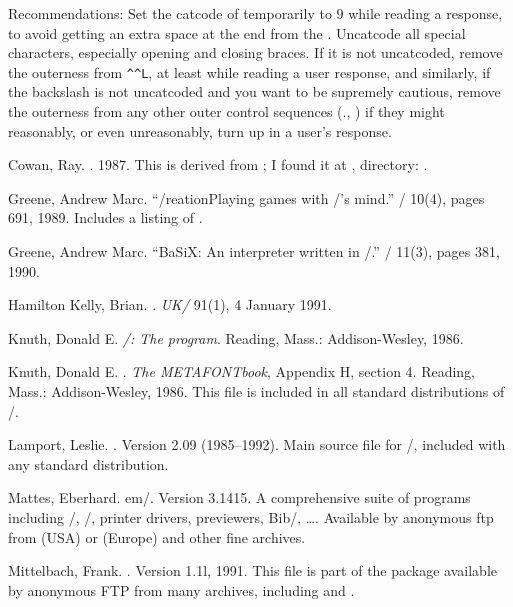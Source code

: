 {Recommendations: Set the catcode of  temporarily to
$9$ while reading a response, to avoid getting an extra space at the
end from the . Uncatcode all special characters, especially
opening and closing braces. If it is not uncatcoded, remove the
outerness from \verb;^^L;, at least while reading a user response, and
similarly, if the backslash is not uncatcoded and you want to be
supremely cautious, remove the outerness from any other outer control
sequences (\eg., ) if they might reasonably, or even
unreasonably, turn up in a user's response.

\begin{thebibliography}{x}

 Cowan, Ray. . 1987. This is
derived from ; I found it at
, directory: .

 Greene, Andrew Marc.
``\tex/reation\Dash Playing games with \tex/'s mind.''
\tugboat/ 10(4), pages 691, 1989. Includes a listing
of .

 Greene, Andrew Marc.
``BaSiX: An interpreter written in \tex/.'' \tugboat/ 11(3),
pages 381, 1990.

{Hamilton Kelly}, Brian. . {\it UK\tex/}
91(1), 4 January 1991.

 Knuth, Donald E. {\sl \tex/: The program}.
Reading, Mass.: Addison-Wesley, 1986.

 Knuth, Donald E. .
{\sl The META\-FONT\-book}, Appendix H, section 4. Reading, Mass.:
Addison-Wesley,  1986. This file is included in all standard
distributions of \mf/.

 Lamport, Leslie. .
Version 2.09 (1985--1992). Main source file for \latex/, included with
any standard distribution.

 Mattes, Eberhard.
em\tex/. Version 3.1415.
A comprehensive suite of programs including \tex/,
\mf/, printer drivers, previewers, Bib\tex/, \dots.
Available by anonymous ftp from  (USA) or
 (Europe) and other fine archives.

 Mittelbach, Frank.
. Version 1.1l, 1991. This file is part of the
 package available by anonymous FTP from many archives,
including  and
.


\end{thebibliography}}
